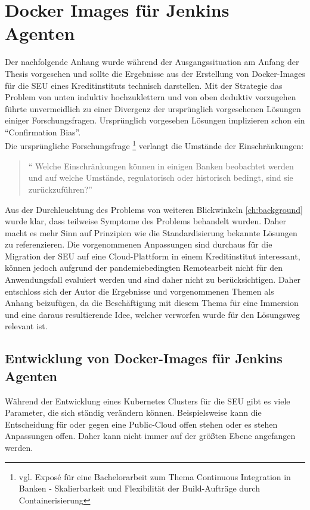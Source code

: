 \chapter{Docker Images für Jenkins Agenten}
\label{appendix:docker}
Der nachfolgende Anhang wurde während der Ausgangssituation am Anfang der Thesis vorgesehen und sollte die Ergebnisse aus der Erstellung von Docker-Images für die \ac{SEU} eines Kreditinstituts technisch darstellen. Mit der Strategie das Problem von unten induktiv hochzuklettern und von oben deduktiv vorzugehen führte unvermeidlich zu einer Divergenz der ursprünglich vorgesehenen Lösungen einiger Forschungsfragen. Ursprünglich vorgesehen Lösungen implizieren schon ein \enquote{Confirmation Bias}.
\medskip
\\
Die ursprüngliche Forschungsfrage
\footnote{vgl. Exposé für eine Bachelorarbeit zum Thema
Continuous Integration in Banken - Skalierbarkeit und
Flexibilität der Build-Aufträge durch Containerisierung}
verlangt die Umstände der Einschränkungen:
\begin{quote}
\enquote{
    Welche Einschränkungen können in einigen Banken beobachtet werden und auf welche
Umstände, regulatorisch oder historisch bedingt, sind sie zurückzuführen?}
\end{quote}

Aus der Durchleuchtung des Problems von weiteren Blickwinkeln \ref{ch:background} wurde klar, dass teilweise Symptome des Problems behandelt wurden. Daher macht es mehr Sinn auf Prinzipien wie die Standardisierung bekannte Lösungen zu referenzieren. Die vorgenommenen Anpassungen sind durchaus für die Migration der \ac{SEU} auf eine Cloud-Plattform in einem Kreditinstitut interessant, können jedoch aufgrund der pandemiebedingten Remotearbeit nicht für den Anwendungsfall evaluiert werden und sind daher nicht zu berücksichtigen. Daher entschloss sich der Autor die Ergebnisse und vorgenommenen Themen als Anhang beizufügen, da die Beschäftigung mit diesem Thema für eine Immersion und eine daraus resultierende Idee, welcher verworfen wurde für den Lösungsweg relevant ist.

\section{Entwicklung von Docker-Images für Jenkins Agenten}

Während der Entwicklung eines Kubernetes Clusters für die \ac{SEU} gibt es viele Parameter, die sich ständig verändern können. Beispielsweise kann die Entscheidung für oder gegen eine Public-Cloud offen stehen oder es stehen Anpassungen offen. Daher kann nicht immer auf der größten Ebene angefangen werden.

